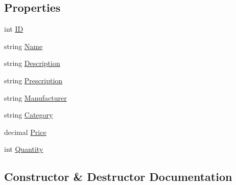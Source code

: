 \subsection*{Properties}
\begin{DoxyCompactItemize}
\item 
int \hyperlink{class_health___assignment_1_1_product_a90e3db8ddf3e3d09bede5391827ede44}{ID}
\item 
string \hyperlink{class_health___assignment_1_1_product_a83e6bed26e812dc35d90700a66f24ca4}{Name}
\item 
string \hyperlink{class_health___assignment_1_1_product_a14e847ae6e2194b56ef59534b4f2b408}{Description}
\item 
string \hyperlink{class_health___assignment_1_1_product_a0947415045905e23dc8b833b08dec783}{Prescription}
\item 
string \hyperlink{class_health___assignment_1_1_product_a80810da898423fd6226a5eca1fa5d93c}{Manufacturer}
\item 
string \hyperlink{class_health___assignment_1_1_product_acb1db9df4361cc690c2d176d8160882f}{Category}
\item 
decimal \hyperlink{class_health___assignment_1_1_product_a9d01e7e9a75b9d8e4d75c66b9a5b65e9}{Price}
\item 
int \hyperlink{class_health___assignment_1_1_product_aa86021131ea86f8a8900748451c7ff8e}{Quantity}
\end{DoxyCompactItemize}


\subsection{Constructor \& Destructor Documentation}
\mbox{\label{class_health___assignment_1_1_product_ad46b6459ab10e3de613af3966eeafc0a}} 
